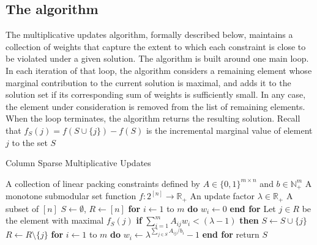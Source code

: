 \documentclass[11pt]{article}
\theoremstyle{plain}
\theoremstyle{definition}
\newcommand{\bbR}{\mathbb{R}}
\newcommand{\bbN}{\mathbb{N}}
\begin{document}
\subsection{The algorithm} \label{subsec:SparseAlgorithm}
The multiplicative updates algorithm, formally described below,
maintains a collection of weights that capture the extent to which
each constraint is close to be violated under a given solution.
The algorithm is built around one main loop. In each iteration of
that loop, the algorithm considers a remaining element whose
marginal contribution to the current solution is maximal, and adds
it to the solution set if its corresponding sum of weights is
sufficiently small. In any case, the element under consideration
is removed from the list of remaining elements. When the loop
terminates, the algorithm returns the resulting solution. Recall
that $f_S(j) = f(S \cup \{j\}) - f(S)$ is the incremental marginal
value of element $j$ to the set $S$

\begin{algorithm}
\caption{Column Sparse Multiplicative Updates}\label{cap:SparseMultiplicativeUpdates}\begin{algorithmic}[1]
\Require A collection of linear packing constraints defined by $A \in \{0,1\}^{m \times n}$ and $b \in \bbN_+^m$ \Statex \qquad\; A monotone submodular set function $f: 2^{[n]} \rightarrow \bbR_{+}$ \Statex \qquad\; An update factor $\lambda \in \bbR_+$ \Ensure A subset of $[n]$ \smallskip 
\State $S \leftarrow \emptyset$, $R \leftarrow [n]$ \State \textbf{for} $i \leftarrow 1$ to $m$ \textbf{do} $w_i \leftarrow 0$ \textbf{end for} \smallskip 
{} \label{alg:SparseStopCond} \State Let $j \in R$ be the element with maximal $f_S(j)$ \State \textbf{if} $\sum_{i=1}^m A_{ij} w_i < (\lambda - 1)$ \textbf{then} $S \leftarrow S \cup \{j\}$ \State $R \leftarrow R \setminus \{j\}$ \State \textbf{for} $i \leftarrow 1$ to $m$ \textbf{do} $w_i \leftarrow \lambda^{\sum_{j \in S} A_{ij} / b_i} - 1$ \textbf{end for} \label{alg:SparseWeightUpdate} \EndWhile \smallskip 
\State return $S$ \end{algorithmic}
\end{algorithm}
\end{document}
